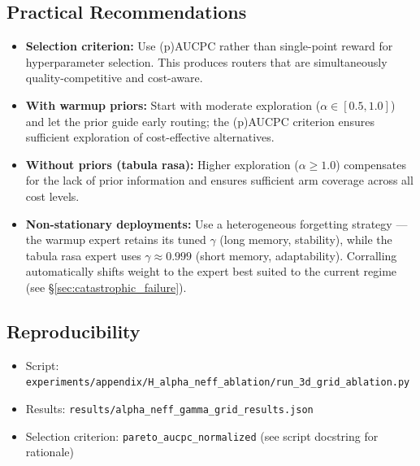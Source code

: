 \subsection{Practical Recommendations}
\label{appendix:alpha_neff_recommendations}

\begin{itemize}[leftmargin=*,noitemsep]
    \item \textbf{Selection criterion:} Use (p)AUCPC rather than
          single-point reward for hyperparameter selection.  This
          produces routers that are simultaneously quality-competitive
          and cost-aware.
    \item \textbf{With warmup priors:} Start with moderate exploration
          ($\alpha \in [0.5, 1.0]$) and let the prior guide early
          routing; the (p)AUCPC criterion ensures sufficient exploration
          of cost-effective alternatives.
    \item \textbf{Without priors (tabula rasa):} Higher exploration
          ($\alpha \geq 1.0$) compensates for the lack of prior
          information and ensures sufficient arm coverage across all
          cost levels.
    \item \textbf{Non-stationary deployments:} Use a heterogeneous
          forgetting strategy --- the warmup expert retains its tuned
          $\gamma$ (long memory, stability), while the tabula rasa expert
          uses $\gamma{\approx}0.999$ (short memory, adaptability).
          Corralling automatically shifts weight to the expert best suited
          to the current regime (see \S\ref{sec:catastrophic_failure}).
\end{itemize}

\subsection{Reproducibility}

\begin{itemize}[noitemsep]
    \item Script: \texttt{experiments/appendix/H\_alpha\_neff\_ablation/run\_3d\_grid\_ablation.py}
    \item Results: \texttt{results/alpha\_neff\_gamma\_grid\_results.json}
    \item Selection criterion: \texttt{pareto\_aucpc\_normalized} (see script docstring for rationale)
\end{itemize}
